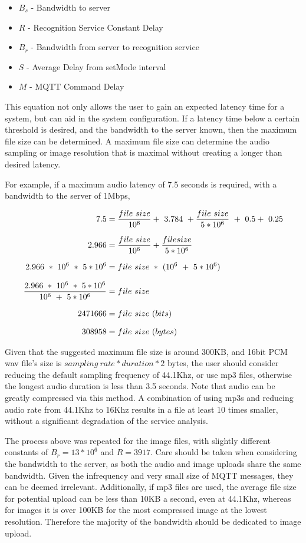 \documentclass{article}
\begin{document}
\begin{itemize}
	\item $B_s$ - Bandwidth to server
	\item $R$ - Recognition Service Constant Delay
	\item $B_r$ - Bandwidth from server to recognition service
	\item $S$ - Average Delay from setMode interval
	\item $M$ - MQTT Command Delay
\end{itemize}

This equation not only allows the user to gain an expected latency time for a system, but can aid in the system configuration. If a latency time below a certain threshold is desired, and the bandwidth to the server known, then the maximum file size can be determined. A maximum file size can determine the audio sampling or image resolution that is maximal without creating a longer than desired latency.

For example, if a maximum audio latency of 7.5 seconds is required, with a bandwidth to the server of 1Mbps, 

\begin{equation*}
\setlength{\jot}{10pt}
\begin{split}
7.5 	&= \frac{file\ size}{10^6} +\ 3.784\ + \frac{file\ size}{5*10^6}\ +\ 0.5 +\ 0.25 \\
2.966 &= \frac{file\ size}{10^6} + \frac{file size}{5*10^6} \\
2.966\ *\ 10^6\ *\ 5*10^6 &= file\ size\ *\ (10^6\ +\ 5*10^6) \\
\frac{2.966\ *\ 10^6\ *\ 5*10^6}{10^6\ +\ 5*10^6 } &= file\ size \\
 2471666&= file\ size\ (bits) \\
 308958 &= file\ size\ (bytes)
\end{split}
\end{equation*}

Given that the suggested maximum file size is around 300KB, and 16bit PCM wav file's size is $sampling\ rate*duration*2$ bytes, the user should consider reducing the default sampling frequency of 44.1Khz, or use mp3 files, otherwise the longest audio duration is less than 3.5 seconds. Note that audio can be greatly compressed via this method. A combination of using mp3s and reducing audio rate from 44.1Khz to 16Khz results in a file at least 10 times smaller, without a significant degradation of the service analysis.

The process above was repeated for the image files, with slightly different constants of $B_r = 13*10^6$ and $R = 3917$. Care should be taken when considering the bandwidth to the server, as both the audio and image uploads share the same bandwidth. Given the infrequency and very small size of MQTT messages, they can be deemed irrelevant. Additionally, if mp3 files are used, the average file size for potential upload can be less than 10KB a second, even at 44.1Khz, whereas for images it is over 100KB for the most compressed image at the lowest resolution. Therefore the majority of the bandwidth should be dedicated to image upload.
\end{document}
